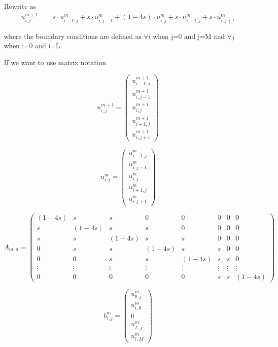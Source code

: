 \documentclass[11pt]{article}
\begin{document}
Rewrite as \begin{equation}
\begin{split} 
u_{i,j}^{m+1} &= s \cdot u_{i-1,j}^m + s \cdot u_{i,j-1}^m + (1-4s) \cdot u_{i,j}^m + s \cdot u_{i+1,j}^m + s \cdot u_{i,j+1}^m 
\end{split}
\end{equation}

where the boundary conditions are defined as \(\forall i\) when j=0 and
j=M and \(\forall j\) when i=0 and i=L.

If we want to use matrix notation

\begin{equation}
u_{i,j}^{m+1} = 
\begin{pmatrix}
u_{i-1,j}^{m+1} \\ u_{i,j-1}^{m+1} \\ u_{i,j}^{m+1} \\ u_{i+1,j}^{m+1} \\ u_{i,j+1}^{m+1} 
\end{pmatrix}
\end{equation}

\begin{equation}
u_{i,j}^m = 
\begin{pmatrix}
u_{i-1,j}^{m} \\ u_{i,j-1}^{m} \\ u_{i,j}^{m} \\ u_{i+1,j}^{m} \\ u_{i,j+1}^{m} 
\end{pmatrix}
\end{equation}

\begin{equation}
A_{m,n} = 
\begin{pmatrix}
(1-4s) & s & s & 0 & 0 & 0 & 0 & 0 \\
s & (1-4s) & s & s & 0 & 0 & 0 & 0 \\
s & s & (1-4s) & s & s & 0 & 0 & 0 \\
0 & s & s & (1-4s) & s & s & 0 & 0 \\
0 & 0 & s & s & (1-4s) & s & s & 0 \\
\vdots & \vdots & \vdots & \vdots & \vdots & \vdots & \vdots & \vdots \\
0 & 0 & 0 & 0 & 0 & s & s & (1-4s) 
\end{pmatrix}
\end{equation}

\begin{equation}
b_{i,j}^m = 
\begin{pmatrix}
u_{0,j}^{m} \\ u_{i,0}^{m} \\ 0 \\ u_{L,j}^{m} \\ u_{i,M}^{m} 
\end{pmatrix}
\end{equation}
\end{document}
